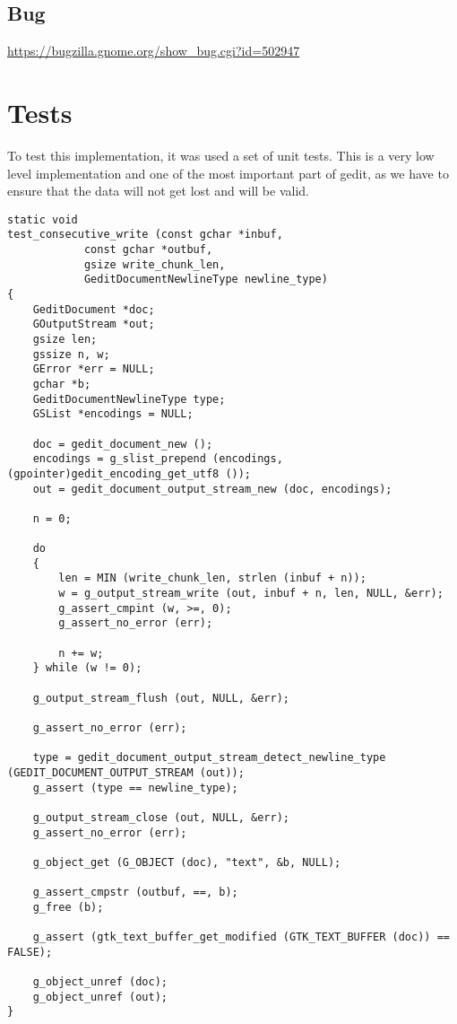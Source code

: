 \subsection{Bug}

\noindent\url{https://bugzilla.gnome.org/show_bug.cgi?id=502947}

\section{Tests}

To test this implementation, it was used a set of unit tests. This is a very low level implementation and one of the most important part of gedit, as we have to ensure that the data will not get lost and will be valid.

\begin{lstlisting}[style=GObject]
static void
test_consecutive_write (const gchar *inbuf,
			const gchar *outbuf,
			gsize write_chunk_len,
			GeditDocumentNewlineType newline_type)
{
	GeditDocument *doc;
	GOutputStream *out;
	gsize len;
	gssize n, w;
	GError *err = NULL;
	gchar *b;
	GeditDocumentNewlineType type;
	GSList *encodings = NULL;

	doc = gedit_document_new ();
	encodings = g_slist_prepend (encodings, (gpointer)gedit_encoding_get_utf8 ());
	out = gedit_document_output_stream_new (doc, encodings);

	n = 0;

	do
	{
		len = MIN (write_chunk_len, strlen (inbuf + n));
		w = g_output_stream_write (out, inbuf + n, len, NULL, &err);
		g_assert_cmpint (w, >=, 0);
		g_assert_no_error (err);

		n += w;
	} while (w != 0);

	g_output_stream_flush (out, NULL, &err);

	g_assert_no_error (err);

	type = gedit_document_output_stream_detect_newline_type (GEDIT_DOCUMENT_OUTPUT_STREAM (out));
	g_assert (type == newline_type);

	g_output_stream_close (out, NULL, &err);
	g_assert_no_error (err);

	g_object_get (G_OBJECT (doc), "text", &b, NULL);

	g_assert_cmpstr (outbuf, ==, b);
	g_free (b);

	g_assert (gtk_text_buffer_get_modified (GTK_TEXT_BUFFER (doc)) == FALSE);

	g_object_unref (doc);
	g_object_unref (out);
}


\end{lstlisting}
